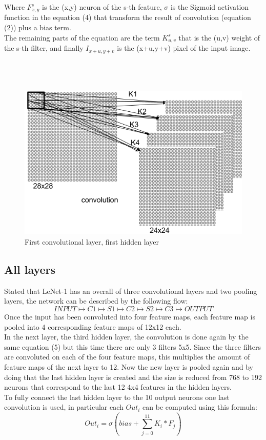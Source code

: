 \documentclass[a4paper]{report}
\begin{document}
Where \( F^{s}_{x,y} \) is the (x,y) neuron of the s-th feature, \( \sigma \) is the Sigmoid activation function in the equation (4) that transform the result of convolution (equation (2)) plus a bias term.\\
The remaining parts of the equation are the term \( K^{s}_{u,v} \) that is the (u,v) weight of the s-th filter, and finally \( I_{x+u,y+v} \) is the (x+u,y+v) pixel of the input image.\\\\\\\\
\begin{figure}[!h]
\centering
\includegraphics[scale=0.3]{docs/c1.png} 
\caption{First convolutional layer, first hidden layer}
\label{fig_c1}
\end{figure}

\subsection{All layers}
Stated that LeNet-1 has an overall of three convolutional layers and two pooling layers, the network can be described by the following flow:
\[ INPUT \mapsto C1 \mapsto S1 \mapsto C2 \mapsto S2 \mapsto C3 \mapsto OUTPUT \]
Once the input has been convoluted into four feature maps, each feature map is pooled into 4 corresponding feature maps of 12x12 each.\\
In the next layer, the third hidden layer, the convolution is done again by the same equation (5) but this time there are only 3 filters 5x5.
Since the three filters are convoluted on each of the four feature maps, this multiplies the amount of feature maps of the next layer to 12.
Now the new layer is pooled again and by doing that the last hidden layer is created and the size is reduced from 768 to 192 neurons that correspond to the last 12 4x4 features in the hidden layers.\\
To fully connect the last hidden layer to the 10 output neurons one last convolution is used, in particular each \( Out_{i} \) can be computed using this formula:
\begin{equation} 
\label{fullyConn}
Out_{i} = \sigma (bias + \sum_{j=0}^{11}K_{i}  * F_{j})
 \end{equation}
 
\end{document}
